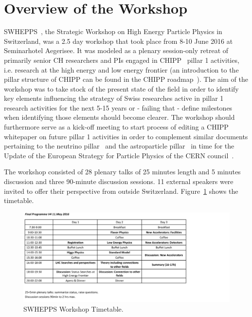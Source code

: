 \section{Overview of the Workshop}\label{Overview}



\noindent SWHEPPS~\cite{workshopindico},  the Strategic Workshop on High Energy Particle Physics in Switzerland, was a 2.5 day workshop that took place from 8-10 June 2016 at 
Seminarhotel Aegerisee.   It was  modeled as a plenary session-only retreat of primarily senior CH researchers and PIs engaged in CHIPP~\cite{chipp} pillar 1 activities, 
i.e. research at the high energy and low energy frontier (an introduction to the pillar structure of CHIPP can be found in the CHIPP roadmap~\cite{roadmap}). The aim  of the workshop
 was to take stock of the present state of the field in order to identify key elements influencing the strategy of Swiss researches active in pillar 1 research activities for the next 5-15 years or
 - failing that - define milestones when identifying those elements should become clearer. The workshop should furthermore serve as a kick-off meeting to start  process of editing a
 CHIPP whitepaper on future pillar 1 activities in order to  complement similar documents pertaining to the neutrino pillar~\cite{neutrinowhitepaper} and the astroparticle 
  pillar~\cite{astroparticlepillarwhitepaper} in time for the Update of the European Strategy for Particle Physics  of the  CERN council~\cite{europeanstrategy}. 


The workshop consisted of 28 plenary talks of 25 minutes length and 5 minutes discussion  and three 90-minute discussion sessions. 11 external speakers were invited to offer
their perspective from outside Switzerland. Figure~\ref{fig:timetable} shows the timetable.

 
\begin{figure}[htb]
  \begin{center}\includegraphics[width=1.1\textwidth]{figures/OverviewTimetable}
    \caption{SWHEPPS Workshop Timetable.}   \label{fig:timetable}
 \end{center}
 \end{figure}

